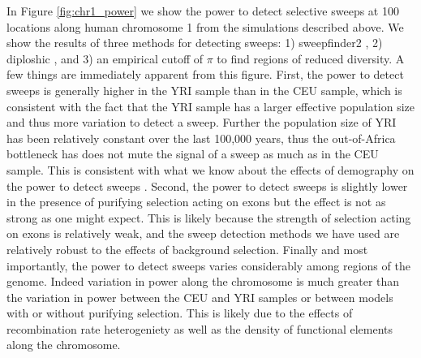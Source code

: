 \documentclass[hidelinks]{article}
\begin{document}
    In Figure \ref{fig:chr1_power} we show the power to detect selective sweeps at 100 locations along human chromosome 1 from
    the simulations described above. We show the results of three methods for detecting sweeps: 1) sweepfinder2 \citep{degiorgio2016sweepfinder2},
    2) diploshic \citep{kern2018diplos}, and 3) an empirical cutoff of $\pi$ to find regions of reduced diversity.
    A few things are immediately apparent from this figure. First, the power to detect sweeps is generally higher in the YRI sample
    than in the CEU sample, which is consistent with the fact that the YRI sample has a larger effective population size and thus
    more variation to detect a sweep. Further the population size of YRI has been relatively constant over the last 100,000 years,
    thus the out-of-Africa bottleneck has does not mute the signal of a sweep as much as in the CEU sample. This is consistent with
    what we know about the effects of demography on the power to detect sweeps \citep[e.g.,][]{simonsen1995properties}.
    Second, the power to detect sweeps is slightly lower in the presence of purifying selection acting on exons but the effect is not
    as strong as one might expect. This is likely because the strength of selection acting on exons is relatively weak, and the
    sweep detection methods we have used are relatively robust to the effects of background selection. 
    Finally and most importantly, the power to detect sweeps varies considerably among regions of the genome. 
    Indeed variation in power along the chromosome is much greater than the variation in power between the CEU and YRI samples or between
    models with or without purifying selection. This is likely due to the effects of recombination rate heterogeniety as well
    as the density of functional elements along the chromosome.
\end{document}

